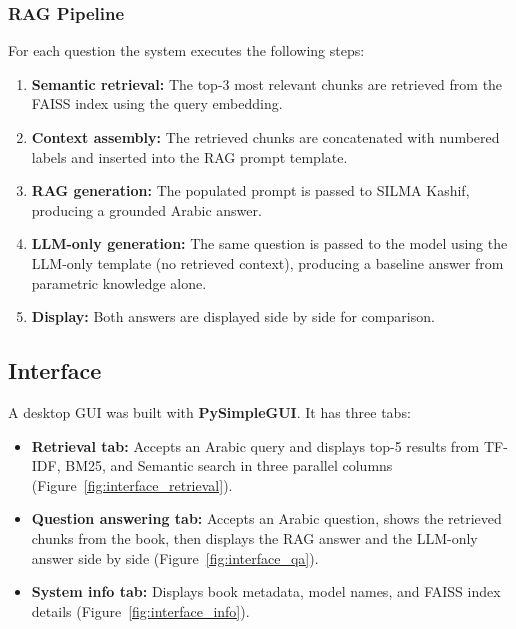 \subsubsection{RAG Pipeline}

For each question the system executes the following steps:

\begin{enumerate}
  \item \textbf{Semantic retrieval:} The top-3 most relevant chunks are retrieved from the FAISS index using the query embedding.
  \item \textbf{Context assembly:} The retrieved chunks are concatenated with numbered labels and inserted into the RAG prompt template.
  \item \textbf{RAG generation:} The populated prompt is passed to SILMA Kashif, producing a grounded Arabic answer.
  \item \textbf{LLM-only generation:} The same question is passed to the model using the LLM-only template (no retrieved context), producing a baseline answer from parametric knowledge alone.
  \item \textbf{Display:} Both answers are displayed side by side for comparison.
\end{enumerate}

\subsection{Interface}

A desktop GUI was built with \textbf{PySimpleGUI}. It has three tabs:

\begin{itemize}
  \item \textbf{Retrieval tab:} Accepts an Arabic query and displays top-5 results from TF-IDF, BM25, and Semantic search in three parallel columns (Figure~\ref{fig:interface_retrieval}).
  \item \textbf{Question answering tab:} Accepts an Arabic question, shows the retrieved chunks from the book, then displays the RAG answer and the LLM-only answer side by side (Figure~\ref{fig:interface_qa}).
  \item \textbf{System info tab:} Displays book metadata, model names, and FAISS index details (Figure~\ref{fig:interface_info}).
\end{itemize}

